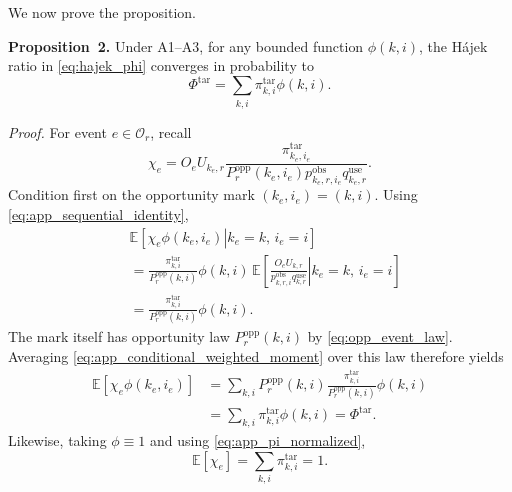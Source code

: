 \documentclass[letterpaper,journal]{IEEEtran}
\begin{document}
We now prove the proposition.

\noindent\textbf{Proposition~2.}
Under A1--A3, for any bounded function $\phi(k,i)$, the H\'ajek ratio in
\eqref{eq:hajek_phi} converges in probability to
\begin{equation}
    \Phi^{\mathrm{tar}}
    =
    \sum_{k,i}
    \pi^{\mathrm{tar}}_{k,i}\phi(k,i).
    \label{eq:app_target_phi}
\end{equation}

\noindent\emph{Proof.}
For event $e\in\mathcal{O}_r$, recall
\begin{equation}
 \chi_e
 =
 O_eU_{k_e,r}
 \frac{
 \pi^{\mathrm{tar}}_{k_e,i_e}
 }{
 P_r^{\mathrm{opp}}(k_e,i_e)
 p^{\mathrm{obs}}_{k_e,r,i_e}
 q^{\mathrm{use}}_{k_e,r}
 }.
 \label{eq:app_chi}
\end{equation}
Condition first on the opportunity mark $(k_e,i_e)=(k,i)$.  Using
\eqref{eq:app_sequential_identity},
\begin{align}
 &\mathbb{E}
 \left[
 \left.
 \chi_e\phi(k_e,i_e)
 \right|
 k_e=k,\,
 i_e=i
 \right]
 \nonumber\\
 &=
 \frac{
 \pi^{\mathrm{tar}}_{k,i}
 }{
 P_r^{\mathrm{opp}}(k,i)
 }
 \phi(k,i)
 \,
 \mathbb{E}
 \left[
 \left.
 \frac{
 O_eU_{k,r}
 }{
 p^{\mathrm{obs}}_{k,r,i}
 q^{\mathrm{use}}_{k,r}
 }
 \right|
 k_e=k,\,
 i_e=i
 \right]
 \nonumber\\
 &=
 \frac{
 \pi^{\mathrm{tar}}_{k,i}
 }{
 P_r^{\mathrm{opp}}(k,i)
 }
 \phi(k,i).
 \label{eq:app_conditional_weighted_moment}
\end{align}
The mark itself has opportunity law
$P_r^{\mathrm{opp}}(k,i)$ by
\eqref{eq:opp_event_law}.  Averaging
\eqref{eq:app_conditional_weighted_moment} over this law therefore yields
\begin{align}
 \mathbb{E}
 \left[
 \chi_e\phi(k_e,i_e)
 \right]
 &=
 \sum_{k,i}
 P_r^{\mathrm{opp}}(k,i)
 \frac{
 \pi^{\mathrm{tar}}_{k,i}
 }{
 P_r^{\mathrm{opp}}(k,i)
 }
 \phi(k,i)
 \nonumber\\
 &=
 \sum_{k,i}
 \pi^{\mathrm{tar}}_{k,i}\phi(k,i)
 =
 \Phi^{\mathrm{tar}}.
 \label{eq:app_expected_numerator_event}
\end{align}
Likewise, taking $\phi\equiv1$ and using
\eqref{eq:app_pi_normalized},
\begin{equation}
    \mathbb{E}[\chi_e]
    =
    \sum_{k,i}\pi^{\mathrm{tar}}_{k,i}
    =1.
    \label{eq:app_expected_denominator_event}
\end{equation}
\end{document}
